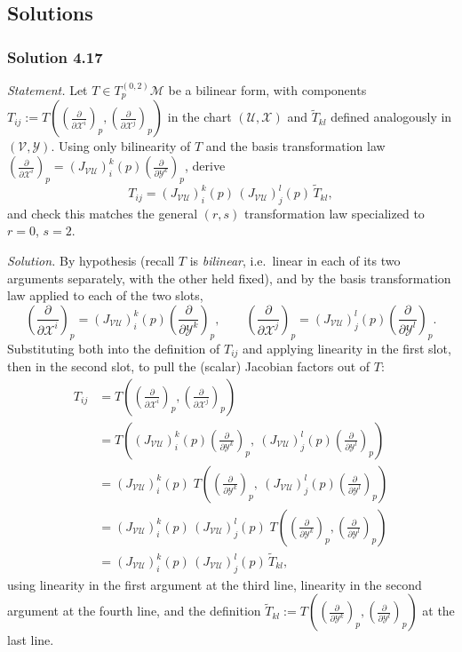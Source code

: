 \documentclass[11pt]{article}
\begin{document}
\subsection*{Solutions}

\subsubsection*{Solution 4.17}

\noindent\textit{Statement.} Let $T\in T_p^{(0,2)}\mathcal M$ be a bilinear
form, with components $T_{ij}:=T\!\left(\left(\frac{\partial}{\partial
\mathcal X^i}\right)_p,\left(\frac{\partial}{\partial\mathcal
X^j}\right)_p\right)$ in the chart $(\mathcal U,\mathcal X)$ and
$\widetilde T_{kl}$ defined analogously in $(\mathcal V,\mathcal Y)$. Using
only bilinearity of $T$ and the basis transformation law
$\left(\frac{\partial}{\partial\mathcal
X^i}\right)_p=(J_{\mathcal{VU}})^k_i(p)\left(\frac{\partial}{\partial
\mathcal Y^k}\right)_p$, derive
\[
T_{ij} = (J_{\mathcal{VU}})^k_i(p)\,(J_{\mathcal{VU}})^l_j(p)\,\widetilde T_{kl},
\]
and check this matches the general $(r,s)$ transformation law specialized
to $r=0$, $s=2$.

\medskip
\noindent\textit{Solution.} By hypothesis (recall $T$ is \emph{bilinear},
i.e.\ linear in each of its two arguments separately, with the other held
fixed), and by the basis transformation law applied to each of the two
slots,
\[
\left(\frac{\partial}{\partial\mathcal X^i}\right)_p=(J_{\mathcal{VU}})^k_i(p)\left(\frac{\partial}{\partial\mathcal Y^k}\right)_p,\qquad
\left(\frac{\partial}{\partial\mathcal X^j}\right)_p=(J_{\mathcal{VU}})^l_j(p)\left(\frac{\partial}{\partial\mathcal Y^l}\right)_p.
\]
Substituting both into the definition of $T_{ij}$ and applying linearity in
the first slot, then in the second slot, to pull the (scalar) Jacobian
factors out of $T$:
\begin{align*}
T_{ij} &= T\!\left(\left(\frac{\partial}{\partial\mathcal X^i}\right)_p,\left(\frac{\partial}{\partial\mathcal X^j}\right)_p\right) \\
&= T\!\left((J_{\mathcal{VU}})^k_i(p)\left(\frac{\partial}{\partial\mathcal Y^k}\right)_p,\ (J_{\mathcal{VU}})^l_j(p)\left(\frac{\partial}{\partial\mathcal Y^l}\right)_p\right) \\
&= (J_{\mathcal{VU}})^k_i(p)\; T\!\left(\left(\frac{\partial}{\partial\mathcal Y^k}\right)_p,\ (J_{\mathcal{VU}})^l_j(p)\left(\frac{\partial}{\partial\mathcal Y^l}\right)_p\right) \\
&= (J_{\mathcal{VU}})^k_i(p)\,(J_{\mathcal{VU}})^l_j(p)\; T\!\left(\left(\frac{\partial}{\partial\mathcal Y^k}\right)_p,\left(\frac{\partial}{\partial\mathcal Y^l}\right)_p\right) \\
&= (J_{\mathcal{VU}})^k_i(p)\,(J_{\mathcal{VU}})^l_j(p)\,\widetilde T_{kl},
\end{align*}
using linearity in the first argument at the third line, linearity in the
second argument at the fourth line, and the definition $\widetilde
T_{kl}:=T\!\left(\left(\frac{\partial}{\partial\mathcal
Y^k}\right)_p,\left(\frac{\partial}{\partial\mathcal
Y^l}\right)_p\right)$ at the last line.
\end{document}
